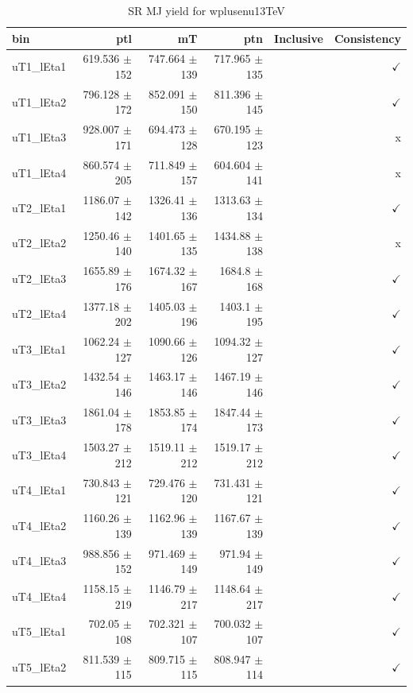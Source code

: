 \begin{table}[htbp]
\centering
\scriptsize
\caption{SR MJ yield for wplusenu13TeV}
\label{tab:wplusenu13TeV}
\setlength{\tabcolsep}{6pt}
\begin{tabular}{lrrrrr}
\hline
bin & ptl & mT & ptn & Inclusive & Consistency \\
\hline
uT1\_lEta1 & 619.536 $\pm$ 152 & 747.664 $\pm$ 139 & 717.965 $\pm$ 135 &  & $\checkmark$ \\
uT1\_lEta2 & 796.128 $\pm$ 172 & 852.091 $\pm$ 150 & 811.396 $\pm$ 145 &  & $\checkmark$ \\
uT1\_lEta3 & 928.007 $\pm$ 171 & 694.473 $\pm$ 128 & 670.195 $\pm$ 123 &  & x \\
uT1\_lEta4 & 860.574 $\pm$ 205 & 711.849 $\pm$ 157 & 604.604 $\pm$ 141 &  & x \\
uT2\_lEta1 & 1186.07 $\pm$ 142 & 1326.41 $\pm$ 136 & 1313.63 $\pm$ 134 &  & $\checkmark$ \\
uT2\_lEta2 & 1250.46 $\pm$ 140 & 1401.65 $\pm$ 135 & 1434.88 $\pm$ 138 &  & x \\
uT2\_lEta3 & 1655.89 $\pm$ 176 & 1674.32 $\pm$ 167 & 1684.8 $\pm$ 168 &  & $\checkmark$ \\
uT2\_lEta4 & 1377.18 $\pm$ 202 & 1405.03 $\pm$ 196 & 1403.1 $\pm$ 195 &  & $\checkmark$ \\
uT3\_lEta1 & 1062.24 $\pm$ 127 & 1090.66 $\pm$ 126 & 1094.32 $\pm$ 127 &  & $\checkmark$ \\
uT3\_lEta2 & 1432.54 $\pm$ 146 & 1463.17 $\pm$ 146 & 1467.19 $\pm$ 146 &  & $\checkmark$ \\
uT3\_lEta3 & 1861.04 $\pm$ 178 & 1853.85 $\pm$ 174 & 1847.44 $\pm$ 173 &  & $\checkmark$ \\
uT3\_lEta4 & 1503.27 $\pm$ 212 & 1519.11 $\pm$ 212 & 1519.17 $\pm$ 212 &  & $\checkmark$ \\
uT4\_lEta1 & 730.843 $\pm$ 121 & 729.476 $\pm$ 120 & 731.431 $\pm$ 121 &  & $\checkmark$ \\
uT4\_lEta2 & 1160.26 $\pm$ 139 & 1162.96 $\pm$ 139 & 1167.67 $\pm$ 139 &  & $\checkmark$ \\
uT4\_lEta3 & 988.856 $\pm$ 152 & 971.469 $\pm$ 149 & 971.94 $\pm$ 149 &  & $\checkmark$ \\
uT4\_lEta4 & 1158.15 $\pm$ 219 & 1146.79 $\pm$ 217 & 1148.64 $\pm$ 217 &  & $\checkmark$ \\
uT5\_lEta1 & 702.05 $\pm$ 108 & 702.321 $\pm$ 107 & 700.032 $\pm$ 107 &  & $\checkmark$ \\
uT5\_lEta2 & 811.539 $\pm$ 115 & 809.715 $\pm$ 115 & 808.947 $\pm$ 114 &  & $\checkmark$ \\

\end{tabular}
\end{table}
